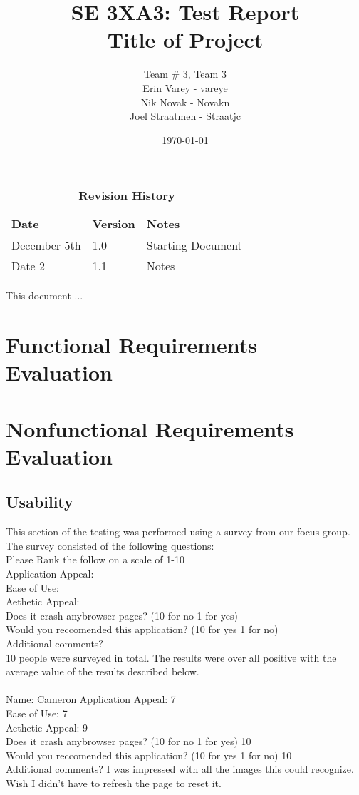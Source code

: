 \documentclass[12pt, titlepage]{article}
\title{SE 3XA3: Test Report\\Title of Project}
\author{Team \# 3, Team 3
		\\ Erin Varey - vareye
		\\ Nik Novak - Novakn
		\\ Joel Straatmen - Straatjc
}
\date{\today}
\begin{document}
\maketitle
{}
\tableofcontents
\listoftables
\listoffigures
\begin{table}[bp]
\caption{\bf Revision History}
\begin{tabularx}{\textwidth}{p{3cm}p{2cm}X}
\toprule {\bf Date} & {\bf Version} & {\bf Notes}\\
\midrule
December 5th & 1.0 & Starting Document\\
Date 2 & 1.1 & Notes\\
\bottomrule
\end{tabularx}
\end{table}
\newpage
{}
This document ...
\section{Functional Requirements Evaluation}
\section{Nonfunctional Requirements Evaluation}
\subsection{Usability}
This section of the testing was performed using a survey from our focus group. The survey consisted of the following questions: \\
Please Rank the follow on a scale of 1-10 \\
Application Appeal:  \\
Ease of Use:\\
Aethetic Appeal: \\
Does it crash anybrowser pages? (10 for no 1 for yes) \\
Would you reccomended this application? (10 for yes 1 for no) \\
Additional comments? \\

10 people were surveyed in total. The results were over all positive with the average value of the results described below.	\\
\\
Name: Cameron
Application Appeal: 7 \\ 
Ease of Use: 7\\ 
Aethetic Appeal: 9\\ 
Does it crash anybrowser pages? (10 for no 1 for yes) 10\\ 
Would you reccomended this application? (10 for yes 1 for no) 10\\ 
Additional comments? I was impressed with all the images this could recognize. Wish I didn't have to refresh the page to reset it.\\
\end{document}
